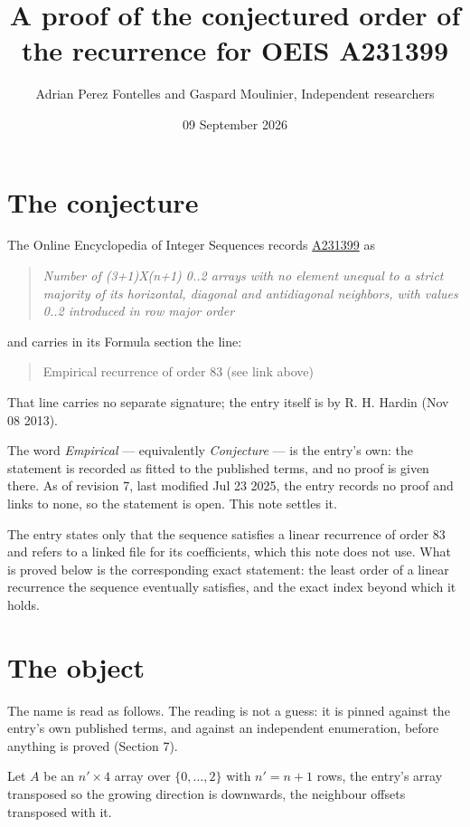 \documentclass[11pt]{article}
\title{A proof of the conjectured order of the recurrence for OEIS A231399}
\author{Adrian Perez Fontelles and Gaspard Moulinier, Independent researchers}
\date{09 September 2026}
\theoremstyle{definition}
\begin{document}
\maketitle
\section{The conjecture}

The Online Encyclopedia of Integer Sequences records \href{https://oeis.org/A231399}{A231399} as

\begin{quote}\itshape Number of (3+1)X(n+1) 0..2 arrays with no element unequal to a strict majority of its horizontal, diagonal and antidiagonal neighbors, with values 0..2 introduced in row major order\end{quote}

and carries in its Formula section the line:

\begin{quote}\ttfamily Empirical recurrence of order 83 (see link above)\end{quote}

That line carries no separate signature; the entry itself is by R. H. Hardin (Nov 08 2013).

The word {\itshape Empirical} --- equivalently {\itshape Conjecture} --- is the entry's own: the statement is recorded as fitted to the published terms, and no proof is given there. As of revision 7, last modified Jul 23 2025, the entry records no proof and links to none, so the statement is open. This note settles it.

The entry states only that the sequence satisfies a linear recurrence of order $83$ and refers to a linked file for its coefficients, which this note does not use. What is proved below is the corresponding exact statement: the least order of a linear recurrence the sequence eventually satisfies, and the exact index beyond which it holds.

\section{The object}

The name is read as follows. The reading is not a guess: it is pinned against the entry's own published terms, and against an independent enumeration, before anything is proved (Section 7).

Let $A$ be an $n' \times 4$ array over $\{0,\dots,2\}$ with $n' = n + 1$ rows, the entry's array transposed so the growing direction is downwards, the neighbour offsets transposed with it.
\end{document}
